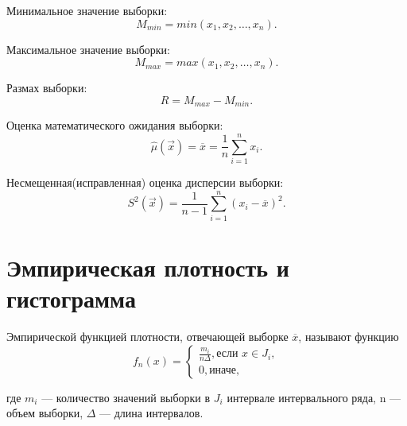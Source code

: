 \documentclass[a4paper, 14pt, unknownkeysallowed]{extreport}
\begin{document}
Минимальное значение выборки:
\begin{equation}
	\label{min}
	M_{min} = min(x_1, x_2,\dots,x_n).
\end{equation}

Максимальное значение выборки:
\begin{equation}
	\label{max}
	M_{max} = max(x_1, x_2,\dots,x_n).
\end{equation}

Размах выборки:
\begin{equation}
	\label{r}
	R = M_{max} - M_{min}.
\end{equation}

Оценка математического ожидания выборки:
\begin{equation}
	\label{mu}
	\hat{\mu}(\overrightarrow{x}) = \overline{x} = \frac{1}{n}\sum_{i=1}^{n}x_i.
\end{equation}

Несмещенная(исправленная) оценка дисперсии выборки:
\begin{equation}
	\label{s2}
	S^2(\overrightarrow{x}) = \frac{1}{n-1}\sum_{i=1}^{n}{(x_i - \overline{x})^2}.
\end{equation}

\section{Эмпирическая плотность и гистограмма}
\begin{definition}
	Эмпирической функцией плотности, отвечающей выборке  $\overline{x}$, называют функцию
	\begin{equation}
		f_{n} (x) = \begin{cases}
			\frac{m_i}{n\Delta}, \text{если $x\in J_i$},\\
			0, \text{иначе},
		\end{cases}
	\end{equation}
\end{definition}
	где $m_i$ --- количество значений выборки в $J_i$ интервале интервального ряда, n --- объем выборки, $\Delta$ --- длина интервалов.
\end{document}
